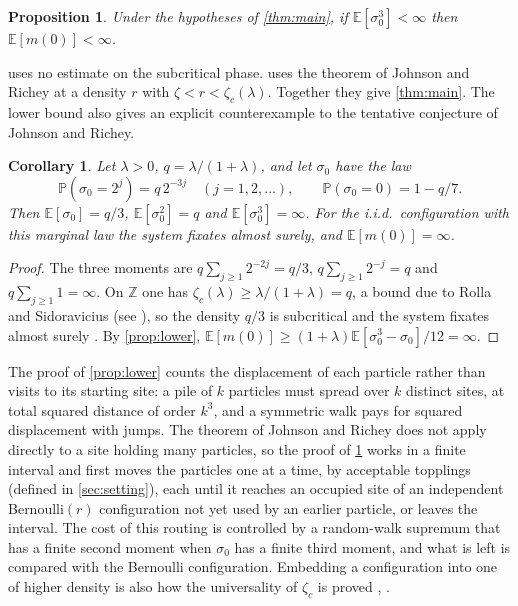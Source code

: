 \documentclass[11pt]{article}
\newtheorem{proposition}[theorem]{Proposition}
\newtheorem{corollary}[theorem]{Corollary}
\theoremstyle{remark}
\newcommand{\Z}{\mathbb Z}
\newcommand{\E}{\mathbb E}
\renewcommand{\P}{\mathbb P}
\newcommand{\1}{\mathbf 1}
\begin{document}
\begin{proposition}\label{prop:upper}
Under the hypotheses of \cref{thm:main}, if $\E[\sigma_0^3]<\infty$ then $\E[m(0)]<\infty$.
\end{proposition}

 uses no estimate on the subcritical phase.  uses the theorem of Johnson and Richey at a density $r$ with $\zeta<r<\zeta_c(\lambda)$. Together they give \cref{thm:main}. The lower bound also gives an explicit counterexample to the tentative conjecture of Johnson and Richey.

\begin{corollary}\label{cor:example}
Let $\lambda>0$, $q=\lambda/(1+\lambda)$, and let $\sigma_0$ have the law
\[
\P(\sigma_0=2^j)=q\,2^{-3j}\quad (j=1,2,\dots),\qquad \P(\sigma_0=0)=1-q/7 .
\]
Then $\E[\sigma_0]=q/3$, $\E[\sigma_0^2]=q$ and $\E[\sigma_0^3]=\infty$. For the i.i.d.\ configuration with this marginal law the system fixates almost surely, and $\E[m(0)]=\infty$.
\end{corollary}

\begin{proof}
The three moments are $q\sum_{j\ge1}2^{-2j}=q/3$, $q\sum_{j\ge1}2^{-j}=q$ and $q\sum_{j\ge1}1=\infty$. On $\Z$ one has $\zeta_c(\lambda)\ge\lambda/(1+\lambda)=q$, a bound due to Rolla and Sidoravicius \cite{RS} (see \cite[Theorem~4.1]{Ro}), so the density $q/3$ is subcritical and the system fixates almost surely \cite[Theorem~2.13]{Ro}. By \cref{prop:lower}, $\E[m(0)]\ge(1+\lambda)\E[\sigma_0^3-\sigma_0]/12=\infty$.
\end{proof}

The proof of \cref{prop:lower} counts the displacement of each particle rather than visits to its starting site: a pile of $k$ particles must spread over $k$ distinct sites, at total squared distance of order $k^3$, and a symmetric walk pays for squared displacement with jumps. The theorem of Johnson and Richey does not apply directly to a site holding many particles, so the proof of \cref{prop:upper} works in a finite interval and first moves the particles one at a time, by acceptable topplings (defined in \cref{sec:setting}), each until it reaches an occupied site of an independent Bernoulli$(r)$ configuration not yet used by an earlier particle, or leaves the interval. The cost of this routing is controlled by a random-walk supremum that has a finite second moment when $\sigma_0$ has a finite third moment, and what is left is compared with the Bernoulli configuration. Embedding a configuration into one of higher density is also how the universality of $\zeta_c$ is proved \cite{RSZ}, \cite[Section~8]{Ro}.
\end{document}
